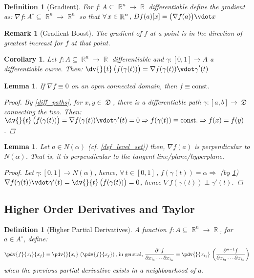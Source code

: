 \documentclass[12pt]{article}
\let\RA\Rightarrow
\renewcommand{\grad}{\nabla}
\newcommand{\Forall}[1]{\forall\,{#1}\,,\,}
\DeclareMathOperator{\R}{\mathbb{R}}
\DeclareMathOperator{\D}{\mathfrak{D}}
\newtheorem{definition}[theorem]{Definition}
\newtheorem{lemma}[theorem]{Lemma}
\newtheorem{corollary}[theorem]{Corollary}
\newtheorem{remark}[theorem]{Remark}
\begin{document}
\begin{definition}[Gradient]
  For $f:A\subseteq\R^n\to\R$ differentiable define the gradient as: $\grad f:A^\circ\subseteq\R^n\to\R^n$ so that $\Forall{x\in \R^n}Df(a)[x]=\big(\grad f(a)\big)\vdot x$
\end{definition}

\begin{remark}[Gradient Boost]
  The gradient of $f$ at a point is in the direction of greatest increast for $f$ at that point.
\end{remark}

\begin{corollary}
  \label{gradient_formula}
  Let $f:A\subseteq\R^n\to\R$ differentiable and $\gamma:[0,1]\to A$ a differentiable curve. Then: $\displaystyle\dv{}{t}\,\big(f(\gamma(t))\big)=\grad f(\gamma(t))\vdot\gamma'(t)$
\end{corollary}

\begin{lemma}
  \label{grad_zero}
  If $\grad f\equiv 0$ on an open connected domain, then $f\equiv \text{const.}$
  \begin{proof}
    By \ref{diff_paths}, for $x,y\in\D$, there is a differentiable path $\gamma:[a,b]\to\D$ connecting the two. Then: $\dv{}{t}\,\big(f(\gamma(t))\big)=\grad f(\gamma(t))\vdot\gamma'(t)=0\RA f(\gamma(t))\equiv \text{const.}\RA f(x)=f(y)$.
  \end{proof}
\end{lemma}

\begin{lemma}
  \label{orthogonal_level}
  Let $a\in N(\alpha)$ (cf. \ref{def_level_set}) then, $\grad f(a)$ is perpendicular to $N(\alpha)$. That is, it is perpendicular to the tangent line/plane/hyperplane.
  \begin{proof}
    Let $\gamma:[0,1]\to N(\alpha)$, hence, $\Forall{t\in[0,1]}f(\gamma(t))=\alpha\RA $ (by \ref{gradient_formula}) $\displaystyle\grad f(\gamma(t))\vdot\gamma'(t)=\dv{}{t}\,\big(f(\gamma(t))\big)=0$, hence $\grad f(\gamma(t))\perp\gamma'(t)$.
  \end{proof}
\end{lemma}

\pagebreak

\subsection{Higher Order Derivatives and Taylor}

\begin{definition}[Higher Partial Derivatives]
  \label{higher_partial}
  A function $f:A\subseteq\R^n\to\R$, for $a\in A^\circ$, define: $$\pdv{f}{x_i}{x_j}=\pdv{}{x_i}\,\left(\pdv{f}{x_j} \right)\text{, in general, }\frac{\partial^n f}{\partial x_{i_1}\cdots\partial x_{i_n}}=\pdv{}{x_{i_1}}\,\left(\frac{\partial^{n-1} f}{\partial x_{i_2}\cdots\partial x_{i_n}} \right)$$
  when the previous partial derivative exists in a neighbourhood of $a$.
\end{definition}
\end{document}
